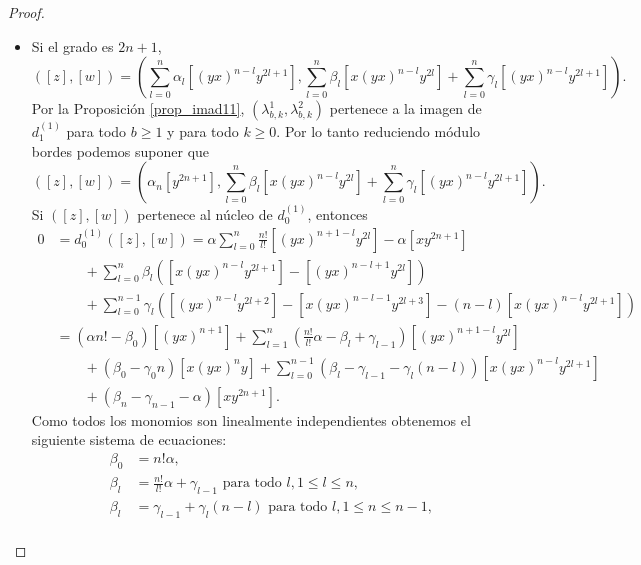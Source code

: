 \documentclass[fleqn,../tesis.tex]{subfiles}
\begin{document}
\begin{proof}
\begin{itemize}
    \item Si el grado es $2n + 1$,
    \[
        ([z], [w]) = \left(\sum_{l = 0}^{n}\alpha_l \left[(yx)^{n - l}y^{2l + 1}\right],
            \sum_{l = 0}^{n}\beta_l \left[x(yx)^{n - l}y^{2l}\right]
                + \sum_{l = 0}^{n}\gamma_l\left[(yx)^{n - l}y^{2l + 1}\right]\right).    
    \]
    Por la Proposición \ref{prop_imad11}, $\left(\lambda_{b, k}^{1}, \lambda_{b, k}^{2}\right)$ pertenece
    a la imagen de $d_1^{(1)}$  para todo $b\geq 1$ y para todo $k \geq 0$. Por lo tanto
    reduciendo módulo bordes podemos suponer que 
    \[
        ([z], [w]) = \left(\alpha_n \left[y^{2n + 1}\right],
            \sum_{l = 0}^{n}\beta_l \left[x(yx)^{n - l}y^{2l}\right]
                + \sum_{l = 0}^{n}\gamma_l\left[(yx)^{n - l}y^{2l + 1}\right]\right). 
    \]
    Si $ ([z], [w])$ pertenece al núcleo de $d_{0}^{(1)}$, entonces
    \begin{align*}
        0 &= d_{0}^{(1)}([z], [w]) = \alpha \sum_{l = 0}^{n}\frac{n!}{l!}\left[(yx)^{n +1 - l}y^{2l}\right] - \alpha \left[xy^{2n + 1}\right]\\
        &\qquad +\sum_{l = 0}^{n}\beta_l \left( \left[x(yx)^{n - l}y^{2l + 1}\right] - \left[(yx)^{n - l + 1}y^{2l} \right] \right)\\
        &\qquad + \sum_{l = 0}^{n - 1}\gamma_l \left( \left[(yx)^{n - l}y^{2l + 2}\right]
            - \left[x(yx)^{n - l - 1}y^{2l + 3}\right] - (n - l)\left[x(yx)^{n - l}y^{2l+ 1}\right]\right)\\
        &= \left(\alpha n! - \beta_0\right)\left[(yx)^{n + 1}\right]
            + \sum_{l = 1}^{n}\left(\frac{n!}{l!}\alpha - \beta_l + \gamma_{l - 1}\right)\left[(yx)^{n + 1 - l}y^{2l}\right]\\
        &\qquad + \left(\beta_0 - \gamma_0 n\right)\left[x(yx)^{n}y\right]
            + \sum_{l = 0}^{n - 1}\left(\beta_l - \gamma_{l - 1} - \gamma_l(n - l)\right)\left[x(yx)^{n - l}y^{2l + 1}\right]\\
        &\qquad + \left(\beta_n - \gamma_{n - 1} - \alpha\right)\left[xy^{2n + 1}\right].
    \end{align*}
    Como todos los monomios son linealmente independientes obtenemos el siguiente sistema de ecuaciones:
    \begin{align*}
        \beta_0 &= n! \alpha,\\
        \beta_l &= \frac{n!}{l!}\alpha + \gamma_{l - 1} \text{ para todo }l, 1 \leq l \leq n,\\
        \beta_l &= \gamma_{l - 1} + \gamma_l(n - l) \text{ para todo } l, 1\leq n \leq n - 1,\\

\end{align*}
\end{itemize}
\end{proof}
\end{document}
